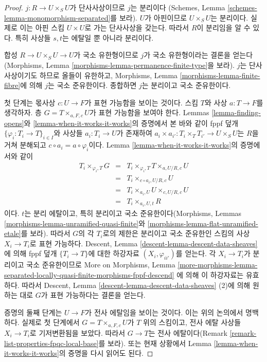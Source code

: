 \begin{proof}
$j : R \to U \times_S U$가 단사사상이므로 $j$는 분리이다
(Schemes, Lemma \ref{schemes-lemma-monomorphism-separated}를 보라).
$U$가 아핀이므로 $U \times_S U$는 분리이다. 실제로 이는 아핀 스킴
$U \times U$로 가는 단사사상을 갖는다. 따라서 $R$이 분리임을 알 수
있다. 특히 사상들 $s, t$는 에탈일 뿐 아니라 분리이다.

\medskip\noindent
합성 $R \to U \times_S U \to U$가 국소 유한형이므로 $j$가
국소 유한형이라는 결론을 얻는다(Morphisms, Lemma
\ref{morphisms-lemma-permanence-finite-type}을 보라).
$j$는 단사사상이기도 하므로 올들이 유한하고, Morphisms, Lemma
\ref{morphisms-lemma-finite-fibre}에 의해 $j$는 국소 준유한이다.
종합하면 $j$는 분리이고 국소 준유한이다.

\medskip\noindent
첫 단계는 몫사상 $c : U \to F$가 표현 가능함을 보이는 것이다.
스킴 $T$와 사상 $a : T \to F$를 생각하자.
층 $G = T \times_{a, F, c} U$가 표현 가능함을 보여야 한다.
Lemmas \ref{lemma-finding-opens}와
\ref{lemma-when-it-works-it-works}의 증명에서 본 바와 같이 fppf 덮개
$\{\varphi_i : T_i \to T\}_{i \in I}$와 사상들 $a_i : T_i \to U$가
존재하여 $a_i \times a_{i'} : T_i \times_T T_{i'} \to U \times_S U$는
$R$을 거쳐 분해되고 $c \circ a_i = a \circ \varphi_i$이다.
Lemma \ref{lemma-when-it-works-it-works}의 증명에서와 같이
\begin{eqnarray*}
T_i \times_{\varphi_i, T} G & = &
T_i \times_{\varphi_i, T} T \times_{a, U/R, c} U \\
& = & T_i \times_{c \circ a_i, U/R, c} U \\
& = & T_i \times_{a_i, U} U \times_{c, U/R, c} U \\
& = & T_i \times_{a_i, U, t} R
\end{eqnarray*}
이다. $t$는 분리 에탈이고, 특히 분리이고 국소 준유한이다(Morphisms,
Lemmas \ref{morphisms-lemma-unramified-quasi-finite}와
\ref{morphisms-lemma-flat-unramified-etale}를 보라).
따라서 $G$의 각 $T_i$로의 제한은 분리이고 국소 준유한인 스킴의 사상
$X_i \to T_i$로 표현 가능하다. Descent, Lemma
\ref{descent-lemma-descent-data-sheaves}에 의해 fppf 덮개
$\{T_i \to T\}$에 대한 하강자료 $(X_i, \varphi_{ii'})$를 얻는다.
각 $X_i \to T_i$가 분리이고 국소 준유한이므로 More on Morphisms,
Lemma
\ref{more-morphisms-lemma-separated-locally-quasi-finite-morphisms-fppf-descend}
에 의해 이 하강자료는 유효하다. 따라서 Descent, Lemma
\ref{descent-lemma-descent-data-sheaves} (2)에 의해 원하는 대로
$G$가 표현 가능하다는 결론을 얻는다.

\medskip\noindent
증명의 둘째 단계는 $U \to F$가 전사 에탈임을 보이는 것이다.
이는 위의 논의에서 명백하다. 실제로 첫 단계에서
$G = T \times_{a, F, c} U$가 $T$ 위의 스킴이고, 전사 에탈 사상들
$X_i \to T_i$로 기저변환됨을 보았다. 따라서 $G \to T$는 전사
에탈이다(Remark \ref{remark-list-properties-fpqc-local-base}를 보라).
또는 현재 상황에서 Lemma \ref{lemma-when-it-works-it-works}의 증명을
다시 읽어도 된다.


\end{proof}
